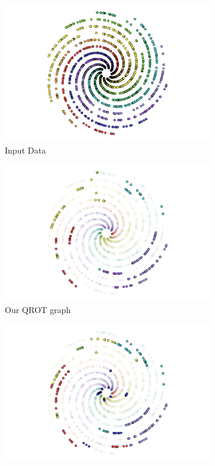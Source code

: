 \documentclass{article}
\begin{document}
\begin{figure}[H]
    \centering
    \begin{subfigure}{0.3\textwidth}
        \includegraphics[width=\textwidth]{LaTeX/figures/SpiralData.png}
        \caption{Input Data}
    \end{subfigure}
    \begin{subfigure}{0.3\textwidth}
    \includegraphics[width=\textwidth]{LaTeX/figures/QOT_infered925.png}
    \caption{Our QROT graph}
    \end{subfigure}
    \begin{subfigure}{0.3\textwidth}
    \includegraphics[width=\textwidth]{LaTeX/figures/KNN_infered857.png}

\end{subfigure}
\end{figure}
\end{document}
